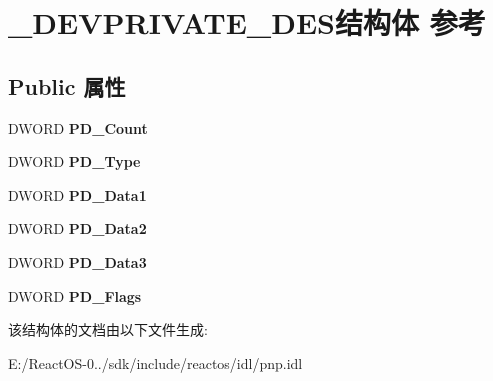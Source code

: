 \hypertarget{struct___d_e_v_p_r_i_v_a_t_e___d_e_s}{}\section{\+\_\+\+D\+E\+V\+P\+R\+I\+V\+A\+T\+E\+\_\+\+D\+E\+S结构体 参考}
\label{struct___d_e_v_p_r_i_v_a_t_e___d_e_s}
\subsection*{Public 属性}
\begin{DoxyCompactItemize}
\item 
\mbox{\label{struct___d_e_v_p_r_i_v_a_t_e___d_e_s_a81f1d576134986f665d1b8a5d0652d64}} 
D\+W\+O\+RD {\bfseries P\+D\+\_\+\+Count}
\item 
\mbox{\label{struct___d_e_v_p_r_i_v_a_t_e___d_e_s_aead646edb55d972fe4f717fb3c881c1a}} 
D\+W\+O\+RD {\bfseries P\+D\+\_\+\+Type}
\item 
\mbox{\label{struct___d_e_v_p_r_i_v_a_t_e___d_e_s_a519d7b7be45251e432bd369ae8706344}} 
D\+W\+O\+RD {\bfseries P\+D\+\_\+\+Data1}
\item 
\mbox{\label{struct___d_e_v_p_r_i_v_a_t_e___d_e_s_a9f25a705d98603d4a82a2154044094f1}} 
D\+W\+O\+RD {\bfseries P\+D\+\_\+\+Data2}
\item 
\mbox{\label{struct___d_e_v_p_r_i_v_a_t_e___d_e_s_a2d3000a2b829c49c6390a03eaa31c279}} 
D\+W\+O\+RD {\bfseries P\+D\+\_\+\+Data3}
\item 
\mbox{\label{struct___d_e_v_p_r_i_v_a_t_e___d_e_s_ab888f0209c7e39d2983db826d1915e75}} 
D\+W\+O\+RD {\bfseries P\+D\+\_\+\+Flags}
\end{DoxyCompactItemize}


该结构体的文档由以下文件生成\+:\begin{DoxyCompactItemize}
\item 
E\+:/\+React\+O\+S-\/0../sdk/include/reactos/idl/pnp.\+idl\end{DoxyCompactItemize}
